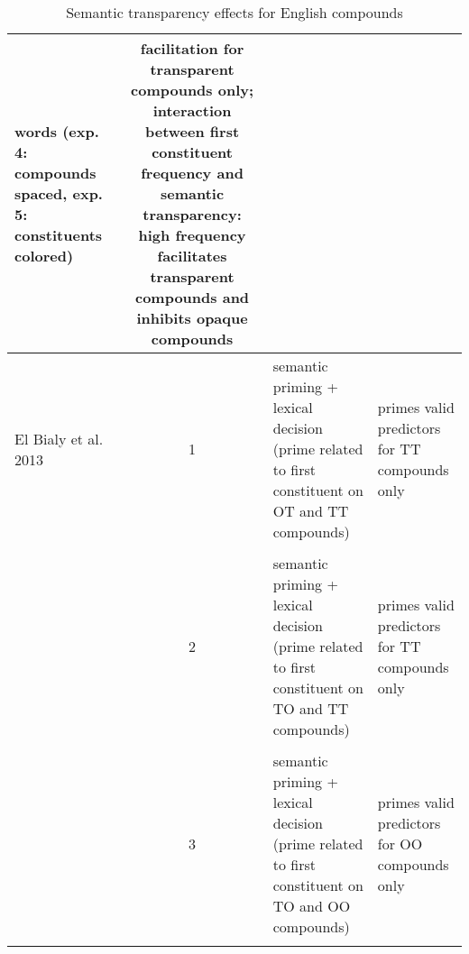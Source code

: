 \begin{table}[p]
{\begin{tabular}[t]{>{\raggedright\arraybackslash}p{1cm}c>{\raggedright\arraybackslash}p{4cm}>{\raggedright\arraybackslash}p{5cm}}
words (exp. 4: compounds spaced, exp. 5: constituents
colored)&facilitation for transparent compounds only;
interaction between first constituent frequency and semantic
transparency: high frequency facilitates transparent compounds and
inhibits opaque compounds\\\midrule
El Bialy et al. 2013&1&semantic priming + lexical decision (prime related to first constituent on OT and TT compounds)&primes valid predictors for TT compounds only\\\\[-.5em] %
&2&semantic priming + lexical decision (prime related to first constituent on TO and TT compounds)&primes valid predictors for TT compounds only\\\\[-.5em] %
&3&semantic priming + lexical decision (prime related to first constituent on TO and OO compounds)&primes valid predictors for OO compounds only\\\lspbottomrule
\end{tabular}
}
\caption{Semantic transparency effects for English compounds}
\label{tab:overview-traces-eng}
\end{table}


